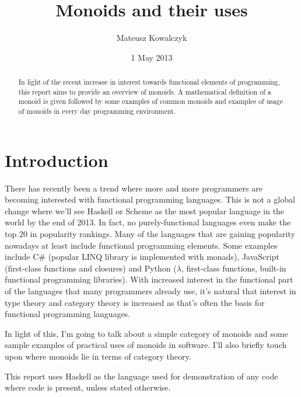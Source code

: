 \documentclass{acm_proc_article-sp}
\begin{document}
\title{Monoids and their uses}
\author{
\alignauthor
Mateusz Kowalczyk
       \\
}

\date{1 May 2013}

\maketitle
\begin{abstract}
In light of the recent increase in interest towards functional
elements of programming, this report aims to provide an overview of
monoids. A mathematical definition of a monoid is given followed by
some examples of common monoids and examples of usage of monoids in
every day programming environment.
\end{abstract}


\section{Introduction}
There has recently been a trend where more and more programmers are
becoming interested with functional programming languages. This is not
a global change where we'll see Haskell or Scheme as the most popular
language in the world by the end of 2013. In fact, no
purely-functional languages even make the top 20 in popularity
rankings\cite{tiobe:rankings}. Many of the languages that are gaining
popularity nowadays at least include functional programming
elements. Some examples include C\# (popular LINQ library is
implemented with monads), JavaScript (first-class functions and
closures) and Python ($\lambda$, first-class functions, built-in
functional programming libraries\cite{python:itertools}). With
increased interest in the functional part of the languages that many
programmers already use, it's natural that interest in type theory and
category theory is increased as that's often the basis for functional
programming languages.

In light of this, I'm going to talk about a simple category of monoids
and some sample examples of practical uses of monoids in
software. I'll also briefly touch upon where monoids lie in terms of
category theory.

This report uses Haskell as the language used for demonstration of any
code where code is present, unless stated otherwise.
\end{document}
